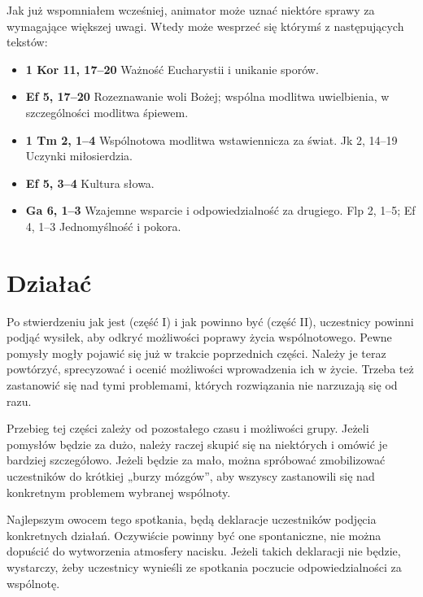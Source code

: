 \documentclass[a5paper,10pt,polish]{book}
\begin{document}
Jak już wspomniałem wcześniej, animator może uznać niektóre sprawy za wymagające większej uwagi. Wtedy może wesprzeć się którymś z następujących tekstów:
\begin{itemize}
\item {} 
\textbf{1 Kor 11, 17–20}   Ważność Eucharystii i unikanie sporów.

\item {} 
\textbf{Ef 5, 17–20}       Rozeznawanie woli Bożej; wspólna modlitwa uwielbienia, w szczególności modlitwa śpiewem.

\item {} 
\textbf{1 Tm 2, 1–4}       Wspólnotowa modlitwa wstawiennicza za świat. Jk 2, 14–19        Uczynki miłosierdzia.

\item {} 
\textbf{Ef 5, 3–4} Kultura słowa.

\item {} 
\textbf{Ga 6, 1–3} Wzajemne wsparcie i odpowiedzialność za drugiego. Flp 2, 1–5; Ef 4, 1–3 Jednomyślność i pokora.

\end{itemize}


\section{Działać}
\label{babice2006-jesien-gliwice/spotkanie3:dzialac}
Po stwierdzeniu jak jest (część I) i jak powinno być (część II), uczestnicy powinni podjąć wysiłek, aby odkryć możliwości poprawy życia wspólnotowego. Pewne pomysły mogły pojawić się już w trakcie poprzednich  części. Należy je teraz powtórzyć, sprecyzować i ocenić możliwości wprowadzenia ich w życie. Trzeba też zastanowić  się nad tymi problemami, których rozwiązania nie narzuzają  się od razu.

Przebieg tej części zależy od pozostałego  czasu i możliwości grupy. Jeżeli pomysłów będzie za dużo, należy raczej skupić się na niektórych i omówić je bardziej szczegółowo. Jeżeli będzie za mało, można spróbować zmobilizować  uczestników do krótkiej „burzy mózgów”, aby wszyscy zastanowili  się nad konkretnym problemem wybranej wspólnoty.

Najlepszym  owocem tego spotkania, będą deklaracje uczestników podjęcia konkretnych działań. Oczywiście powinny być one spontaniczne, nie można dopuścić do wytworzenia atmosfery nacisku. Jeżeli takich deklaracji nie będzie, wystarczy,  żeby uczestnicy wynieśli ze spotkania  poczucie odpowiedzialności za wspólnotę.
\end{document}
